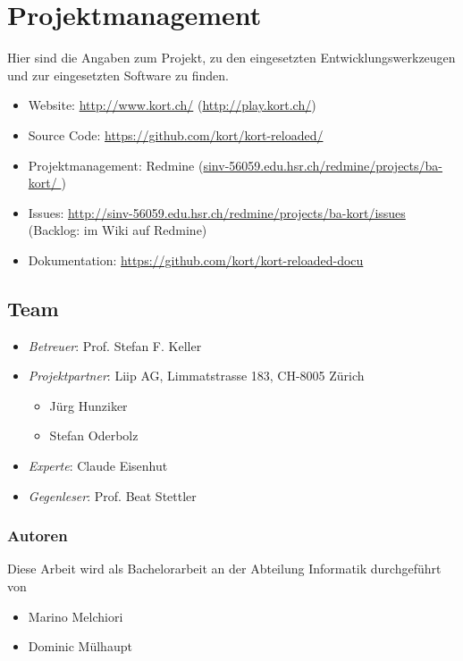 \chapter{Projektmanagement}
\label{pm-projektmanagement}
Hier sind die Angaben zum Projekt, zu den eingesetzten Entwicklungswerkzeugen und zur eingesetzten Software zu finden.

\begin{itemize}
    \item Website: \url{http://www.kort.ch/} (\url{http://play.kort.ch/})
    \item Source Code: \url{https://github.com/kort/kort-reloaded/}
    \item Projektmanagement: Redmine (\url{sinv-56059.edu.hsr.ch/redmine/projects/ba-kort/ })
    \item Issues: \url{http://sinv-56059.edu.hsr.ch/redmine/projects/ba-kort/issues}  (Backlog: im Wiki auf Redmine) 
    \item Dokumentation: \url{https://github.com/kort/kort-reloaded-docu}
\end{itemize}

\section{Team}
\label{pm-team}
\begin{itemize}
	\item \textit{Betreuer}: Prof. Stefan F. Keller
	\item \textit{Projektpartner}: Liip AG, Limmatstrasse 183, CH-8005 Zürich
	\begin{itemize}
		\item Jürg Hunziker
		\item Stefan Oderbolz
	\end{itemize}
	\item \textit{Experte}: Claude Eisenhut
	\item \textit{Gegenleser}: Prof. Beat Stettler
\end{itemize}

\subsection*{Autoren}
\label{pm-team-autoren}
Diese Arbeit wird als Bachelorarbeit an der Abteilung Informatik durchgeführt von
\begin{itemize}
	\item Marino Melchiori
	\item Dominic Mülhaupt
\end{itemize}

